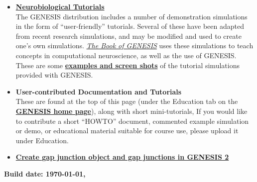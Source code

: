 \documentclass[12pt]{article}
\begin{document}
\begin{itemize}
\item \href{http://www.genesis-sim.org/GENESIS/Tutorials_summary.html}{\bf Neurobiological Tutorials}\\
The GENESIS distribution includes a number of demonstration simulations in the form of ``user-friendly'' tutorials. Several of these have been adapted from recent research simulations, and may be modified and used to create one's own simulations. \href{http://www.genesis-sim.org/GENESIS/bog/bog.html}{\it The Book of GENESIS} uses these simulations to teach concepts in computational neuroscience, as well as the use of GENESIS. These are some \href{http://www.genesis-sim.org/GENESIS/illtuts/illtuts.html}{\bf examples and screen shots} of the tutorial simulations provided with GENESIS.

\item {\bf User-contributed Documentation and Tutorials}\\
These are found at the top of this page (under the Education tab on the \href{http://www.genesis-sim.org}{\bf GENESIS home page}), along with short mini-tutorials, If you would like to contribute a short ``HOWTO'' document, commented example simulation or demo, or educational material suitable for course use, please upload it under Education.

\item \href{../g2-gap-junction/g2-gap-junction.tex}{\bf Create gap junction object and gap junctions in GENESIS 2}

\end{itemize}

{\bf Build date: \today, \thistime}
\end{document}
